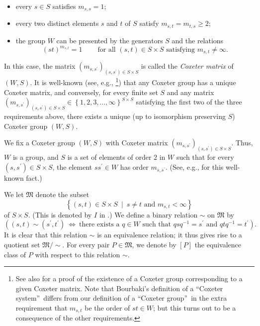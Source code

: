 \documentclass[numbers=enddot,12pt,final,onecolumn,notitlepage,abstracton]{scrartcl}%
\theoremstyle{definition}
\begin{document}
\begin{itemize}
\item every $s\in S$ satisfies $m_{s,s}=1$;

\item every two distinct elements $s$ and $t$ of $S$ satisfy $m_{s,t}%
=m_{t,s}\geq2$;

\item the group $W$ can be presented by the generators $S$ and the relations
\[
\left(  st\right)  ^{m_{s,t}}=1\ \ \ \ \ \ \ \ \ \ \text{for all }\left(
s,t\right)  \in S\times S\text{ satisfying }m_{s,t}\neq\infty.
\]

\end{itemize}

In this case, the matrix $\left(  m_{s,s^{\prime}}\right)  _{\left(
s,s^{\prime}\right)  \in S\times S}$ is called the \emph{Coxeter matrix} of
$\left(  W,S\right)  $. It is well-known (see, e.g., \cite[\S 1]%
{Lusztig-Hecke}\footnote{See also \cite[Chapter V, n$^{\circ}$ 4.3,
Corollaire]{Bourbaki4-6} for a proof of the existence of a Coxeter group
corresponding to a given Coxeter matrix. Note that Bourbaki's definition of a
\textquotedblleft Coxeter system\textquotedblright\ differs from our
definition of a \textquotedblleft Coxeter group\textquotedblright\ in the
extra requirement that $m_{s,t}$ be the order of $st\in W$; but this turns out
to be a consequence of the other requirements.}) that any Coxeter group has a
unique Coxeter matrix, and conversely, for every finite set $S$ and any matrix
$\left(  m_{s,s^{\prime}}\right)  _{\left(  s,s^{\prime}\right)  \in S\times
S}\in\left\{  1,2,3,\ldots,\infty\right\}  ^{S\times S}$ satisfying the first
two of the three requirements above, there exists a unique (up to isomorphism
preserving $S$) Coxeter group $\left(  W,S\right)  $.

We fix a Coxeter group $\left(  W,S\right)  $ with Coxeter matrix $\left(
m_{s,s^{\prime}}\right)  _{\left(  s,s^{\prime}\right)  \in S\times S}$. Thus,
$W$ is a group, and $S$ is a set of elements of order $2$ in $W$ such that for
every $\left(  s,s^{\prime}\right)  \in S\times S$, the element $ss^{\prime
}\in W$ has order $m_{s,s^{\prime}}$. (See, e.g., \cite[Proposition
1.3(b)]{Lusztig-Hecke} for this well-known fact.)

We let $\mathfrak{M}$ denote the subset%
\[
\left\{  \left(  s,t\right)  \in S\times S\ \mid\ s\neq t\text{ and }%
m_{s,t}<\infty\right\}
\]
of $S\times S$. (This is denoted by $I$ in \cite[Chapter 4, n$^{\circ}$
1.3]{Bourbaki4-6}.) We define a binary relation $\sim$ on $\mathfrak{M}$ by%
\[
\left(  \left(  s,t\right)  \sim\left(  s^{\prime},t^{\prime}\right)
\ \Longleftrightarrow\ \text{there exists a }q\in W\text{ such that }%
qsq^{-1}=s^{\prime}\text{ and }qtq^{-1}=t^{\prime}\right)  .
\]
It is clear that this relation $\sim$ is an equivalence relation; it thus
gives rise to a quotient set $\mathfrak{M}/\sim$. For every pair
$P\in\mathfrak{M}$, we denote by $\left[  P\right]  $ the equivalence class of
$P$ with respect to this relation $\sim$.
\end{document}
